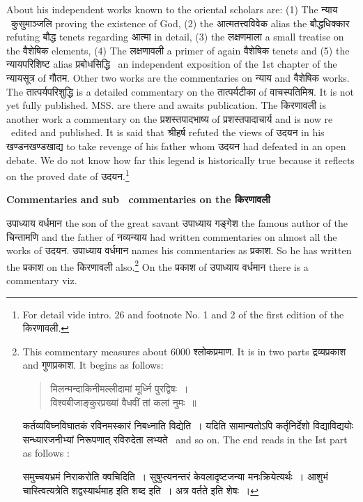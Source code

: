 \documentclass[11pt, openany]{book}
\begin{document}
About his independent works known to the oriental scholars are: (1) The न्याय \textendash\ कुसुमाञ्जलि proving the existence of God, (2) the आत्मतत्त्वविवेक alias the बौद्धधिक्कार refuting बौद्ध tenets regarding आत्मा in detail, (3) the लक्षणमाला a small treatise on the वैशेषिक elements, (4) The लक्षणावली a primer of again वैशेषिक tenets and (5) the न्यायपरिशिष्ट alias प्रबोधसिद्धि  \textendash\ an independent exposition of the 1st chapter of the न्यायसूत्र of गौतम. Other two works are the commentaries on न्याय and वैशेषिक works. The तात्पर्यपरिशुद्धि is a detailed commentary on the तात्पर्यटीका of वाचस्पतिमिश्र. It is not yet fully published. MSS. are there and awaits publication. The किरणावली is another work a commentary on the प्रशस्तपादभाष्य of प्रशस्तपादाचार्य and is now re \textendash\ edited and published. It is said that श्रीहर्ष refuted the views of उदयन in his खण्डनखण्डखाद्य to take revenge of his father whom उदयन had defeated in an open debate. We do not know how far this legend is historically true because it reflects on the proved date of उदयन.\renewcommand{\thefootnote}{1}\footnote{For detail vide intro. 26 and footnote No. 1 and 2 of the first edition of the किरणावली.}

\noindent
\textbf{Commentaries and sub \textendash\ commentaries on the किरणावली}

उपाध्याय वर्धमान the son of the great savant उपाध्याय गङ्गेश the famous author of the चिन्तामणि and the father of नव्यन्याय had written commentaries on almost all the works of उदयन. उपाध्याय वर्धमान names his commentaries as प्रकाश. So he has written the प्रकाश on the किरणावली also.\renewcommand{\thefootnote}{2}\footnote{This commentary measures about 6000 श्लोकप्रमाण. It is in two parts द्रव्यप्रकाश and गुणप्रकाश. It begins as follows: \textendash
\begin{quote}
{\qt मिलन्मन्दाकिनीमल्लीदामां मूर्ध्नि पुरद्विषः~।\\
विश्वबीजाङ्कुरप्रख्यां वैधवीं तां कलां नुमः~॥}
\end{quote}

कर्तव्यविघ्नविघातकं रविनमस्कारं निबध्नाति विद्येति~। यदिति सामान्यतोऽपि कर्तृनिर्देशो विद्याविद्ययोः सन्ध्यारजनीभ्यां निरूपणात् रविरुदेता लभ्यते \textendash\ and so on. The end reads in the Ist part as follows :

समुच्चयभ्रमं निराकरोति क्वचिदिति~। सुषुप्त्यनन्तरं केवलादृष्टजन्या मनःक्रियेत्यर्थः~। आशुभं चास्त्वित्यत्रेति शद्वस्यार्थमाह इति शब्द इति~। अत्र वर्तते इति शेषः~।} On the प्रकाश of उपाध्याय वर्धमान there is a commentary viz.
\end{document}
